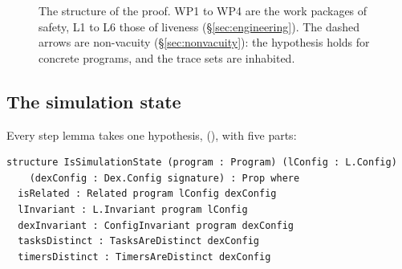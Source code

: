 \begin{figure}[t]
\caption{The structure of the proof. WP1 to WP4 are the work packages of
safety, L1 to L6 those of liveness (\S\ref{sec:engineering}). The dashed
arrows are non-vacuity (\S\ref{sec:nonvacuity}): the hypothesis holds for
concrete programs, and the trace sets are inhabited.}
\label{fig:architecture}
\end{figure}

\subsection{The simulation state}
\label{sec:relation}

Every step lemma takes one hypothesis, 
(), with five parts:

\begin{Verbatim}
structure IsSimulationState (program : Program) (lConfig : L.Config)
    (dexConfig : Dex.Config signature) : Prop where
  isRelated : Related program lConfig dexConfig
  lInvariant : L.Invariant program lConfig
  dexInvariant : ConfigInvariant program dexConfig
  tasksDistinct : TasksAreDistinct dexConfig
  timersDistinct : TimersAreDistinct dexConfig
\end{Verbatim}

